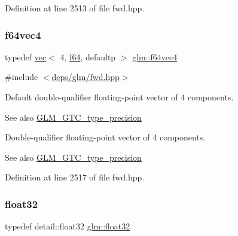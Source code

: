 Definition at line 2513 of file fwd.\+hpp.

\mbox{\label{group__gtc__type__precision_ga41fb27973aedd37b7284789f2f997420}} 
\subsubsection{\texorpdfstring{f64vec4}{f64vec4}}
{\footnotesize\ttfamily typedef \hyperlink{structglm_1_1vec}{vec}$<$ 4, \hyperlink{group__gtc__type__precision_ga2bba392e555124b36cde6abba349bab3}{f64}, defaultp $>$ \hyperlink{group__gtc__type__precision_ga41fb27973aedd37b7284789f2f997420}{glm\+::f64vec4}}



{\ttfamily \#include $<$\hyperlink{fwd_8hpp}{deps/glm/fwd.\+hpp}$>$}

Default double-\/qualifier floating-\/point vector of 4 components. \begin{DoxySeeAlso}{See also}
\hyperlink{group__gtc__type__precision}{G\+L\+M\+\_\+\+G\+T\+C\+\_\+type\+\_\+precision}
\end{DoxySeeAlso}
Double-\/qualifier floating-\/point vector of 4 components. \begin{DoxySeeAlso}{See also}
\hyperlink{group__gtc__type__precision}{G\+L\+M\+\_\+\+G\+T\+C\+\_\+type\+\_\+precision} 
\end{DoxySeeAlso}


Definition at line 2517 of file fwd.\+hpp.

\mbox{\label{group__gtc__type__precision_ga814f2f65354b6588b067cc5c67a6b340}} 
\subsubsection{\texorpdfstring{float32}{float32}}
{\footnotesize\ttfamily typedef detail\+::float32 \hyperlink{group__gtc__type__precision_ga814f2f65354b6588b067cc5c67a6b340}{glm\+::float32}}



